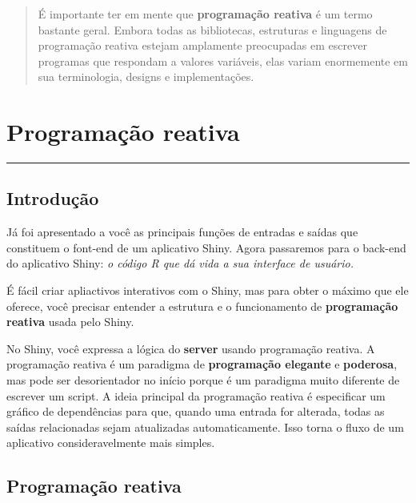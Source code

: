 \documentclass[
]{book}
\begin{document}
\begin{quote}
É importante ter em mente que \textbf{programação reativa} é um termo bastante geral. Embora todas as bibliotecas, estruturas e linguagens de programação reativa estejam amplamente preocupadas em escrever programas que respondam a valores variáveis, elas variam enormemente em sua terminologia, designs e implementações.
\end{quote}

\hypertarget{programauxe7uxe3o-reativa}{%
\chapter{\texorpdfstring{\textbf{Programação reativa}}{Programação reativa}}\label{programauxe7uxe3o-reativa}}

\begin{center}\rule{0.5\linewidth}{0.5pt}\end{center}

\hypertarget{introduuxe7uxe3o-1}{%
\section{\texorpdfstring{\textbf{Introdução}}{Introdução}}\label{introduuxe7uxe3o-1}}

Já foi apresentado a você as principais funções de entradas e saídas que constituem o font-end de um aplicativo Shiny. Agora passaremos para o back-end do aplicativo Shiny: \emph{o código R que dá vida a sua interface de usuário.}

É fácil criar apliactivos interativos com o Shiny, mas para obter o máximo que ele oferece, você precisar entender a estrutura e o funcionamento de \textbf{programação reativa} usada pelo Shiny.

No Shiny, você expressa a lógica do \textbf{server} usando programação reativa. A programação reativa é um paradigma de \textbf{programação elegante} e \textbf{poderosa}, mas pode ser desorientador no início porque é um paradigma muito diferente de escrever um script. A ideia principal da programação reativa é especificar um gráfico de dependências para que, quando uma entrada for alterada, todas as saídas relacionadas sejam atualizadas automaticamente. Isso torna o fluxo de um aplicativo consideravelmente mais simples.

\hypertarget{programauxe7uxe3o-reativa-1}{%
\section{\texorpdfstring{\textbf{Programação reativa}}{Programação reativa}}\label{programauxe7uxe3o-reativa-1}}
\end{document}
